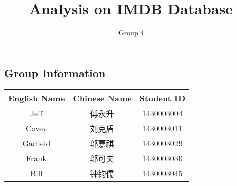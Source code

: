 \documentclass{article}
\author{Group 4}
\title{Analysis on IMDB Database}
\begin{document}
    \begin{CJK}{UTF8}{gbsn}
        \maketitle
        \section{Group Information}
        \begin{tabular} {|c|c|c|}
            \hline
            English Name & Chinese Name & Student ID \\
            \hline
            Jeff & 傅永升 & 1430003004 \\
            \hline
            Covey & 刘克盾 & 1430003011 \\
            \hline
            Garfield & 邬嘉祺 & 1430003029 \\
            \hline
            Frank & 邬可夫 & 1430003030 \\
            \hline
            Bill & 钟钧儒 & 1430003045 \\
            \hline
        \end{tabular}
    \end{CJK}
    
\end{document}

